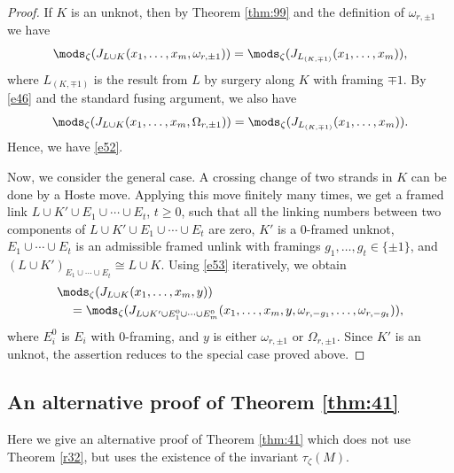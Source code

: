 \documentclass{amsart}
\numberwithin{equation}{section}
\numberwithin{figure}{section}
\theoremstyle{plain}
\theoremstyle{definition}
\theoremstyle{remark}
\begin{document}
\begin{proof}
  If $K$ is an unknot, then by Theorem \ref{thm:99} and the definition
  of $\omega _{r,\pm 1}$ we have
  \begin{equation}
    \label{e53}
    \mods _\zeta (J_{L\cup K}(x_1,\ldots,x_m,\omega _{r,\pm 1})) =
    \mods _\zeta (J_{L_{(K,\mp1)}}(x_1,\ldots,x_m)),
  \end{equation}
  where $L_{(K,\mp1)}$ is the result from $L$ by surgery along $K$
  with framing $\mp1$.  By \eqref{e46} and the standard fusing
  argument, we also have
  \begin{equation*}
    \mods _\zeta (J_{L\cup K}(x_1,\ldots,x_m,\Omega _{r,\pm 1})) = \mods _\zeta (J_{L_{(K,\mp1)}}(x_1,\ldots,x_m)).
  \end{equation*}
  Hence, we have \eqref{e52}.

  Now, we consider the general case.  A crossing change of two strands
  in $K$ can be done by a Hoste move.  Applying this move finitely
  many times, we get a framed link $L\cup K'\cup E_1\cup \cdots\cup E_t$, $t\ge 0$,
  such that all the linking numbers between two components of
  $L\cup K'\cup E_1\cup \cdots\cup E_t$ are zero, $K'$ is a $0$-framed unknot,
  $E_1\cup \cdots\cup E_t$ is an admissible framed unlink with framings
  $g_1,\ldots,g_t\in \{\pm 1\}$, and $(L\cup K')_{E_1\cup \cdots\cup E_t}\cong
  L\cup K$.  Using \eqref{e53} iteratively, we obtain
  \begin{equation*}
    \begin{split}
      &\mods _\zeta (J_{L\cup K}(x_1,\ldots,x_m,y))\\
      &\quad =\mods _\zeta (J_{L\cup K'\cup E_1^0\cup \cdots\cup E_m^0}
      (x_1,\ldots,x_m,y,\omega _{r,-g_1},\ldots,\omega _{r,-g_t})) ,
    \end{split}
  \end{equation*}
  where $E_i^0$ is $E_i$ with $0$-framing, and $y$ is either
  $\omega _{r,\pm 1}$ or $\Omega _{r,\pm 1}$.  Since $K'$ is an unknot, the
  assertion reduces to the special case proved above.
\end{proof}

\subsection{An alternative proof of Theorem \ref{thm:41}}
\label{sec:an-alternative-proof}

Here we give an alternative proof of Theorem \ref{thm:41} which does
not use Theorem \ref{r32}, but uses the existence of the
invariant $\tau _\zeta (M)$.
\end{document}
